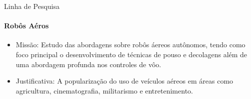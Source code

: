 \begin{frame}[t]{Linha de Pesquisa}
    \framesubtitle{Robôs Aéros} 
    \transdissolve[duration=0.5]
    \large{
    \begin{itemize}
        \item Missão: Estudo das abordagens sobre robôs áereos autônomos, tendo como foco principal o desenvolvimento de técnicas de pouso e decolagens além de uma abordagem profunda nos controles de vôo.
        \vspace*{1cm}
        \item Justificativa: A popularização do uso de veículos aéreos em áreas como agricultura, cinematografia, militarismo e entretenimento.
    \end{itemize}

        
        
    }
\end{frame}
   

    
